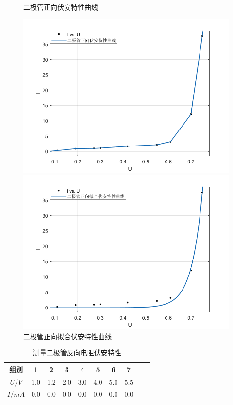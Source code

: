 \documentclass[UTF8]{ctexart}
\begin{document}
\begin{figure}[H]  %
	\begin{minipage}[t]{0.5\linewidth}
		\centering
            \caption*{二极管正向伏安特性曲线}
		\includegraphics[width=1.0\textwidth]{img/二极管正向伏安特性曲线.png}
	\end{minipage}
	\qquad
	\begin{minipage}[t]{0.5\linewidth}
		\centering 
            \caption*{二极管正向拟合伏安特性曲线}
		\includegraphics[width=1.0\textwidth]{img/二极管正向拟合伏安特性曲线.png}
	\end{minipage}
 \end{figure}
 \begin{table}[H]
    \centering
    \caption*{测量二极管反向电阻伏安特性}
    \begin{tabular}{|c|c|c|c|c|c|c|c|c|c|}
    \hline
      组别   & 1 & 2 & 3 & 4 & 5 & 6 & 7   \\
    \hline
       $U/V$  &  1.0  &1.2 &  2.0   & 3.0  &  4.0  & 5.0  &  5.5        \\
    \hline
       $I/mA$ &   0.0  & 0.0  & 0.0  & 0.0  & 0.0  & 0.0  & 0.0 \\
    \hline
    \end{tabular}
\end{table}
\end{document}
